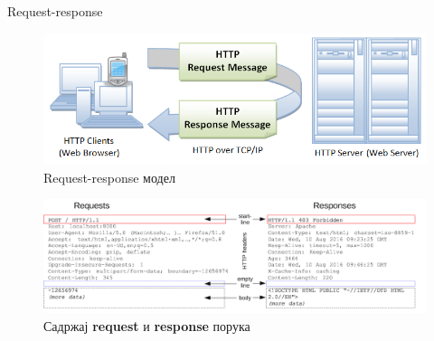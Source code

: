 \documentclass[aspectratio=169]{beamer}
\begin{document}
    \begin{frame}[allowframebreaks]{Request-response}
        \begin{figure}
            \centering
            \includegraphics[width=\textwidth,height=\textheight,keepaspectratio]{images/reqres.png}
            \caption{Request-response модел}
            \label{fig:reqres}
        \end{figure}
        
        \framebreak
        
        \begin{figure}
            \centering
            \includegraphics[width=\textwidth,height=\textheight,keepaspectratio]{images/httpmsgstructure.png}
            \caption{Садржај \textbf{request} и \textbf{response} порука}
            \label{fig:reqrescont}
        \end{figure}
        
        \framebreak
        

\end{frame}
\end{document}
